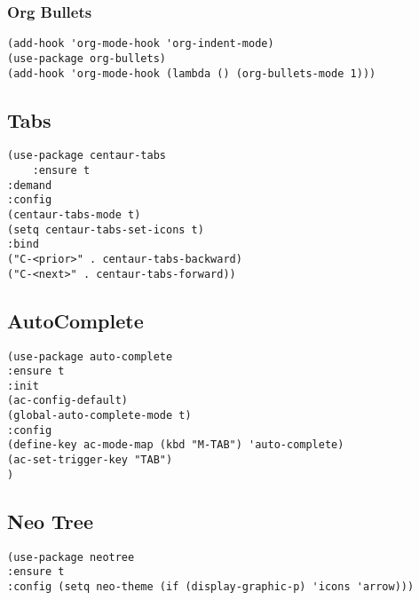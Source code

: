 \documentclass[11pt]{article}
\begin{document}
\subsubsection{Org Bullets}
\label{sec:org6249800}
\begin{verbatim}
(add-hook 'org-mode-hook 'org-indent-mode)
(use-package org-bullets)
(add-hook 'org-mode-hook (lambda () (org-bullets-mode 1)))
\end{verbatim}

\subsection{Tabs}
\label{sec:org4a150cb}
\begin{verbatim}
(use-package centaur-tabs
    :ensure t
:demand
:config
(centaur-tabs-mode t)
(setq centaur-tabs-set-icons t)
:bind
("C-<prior>" . centaur-tabs-backward)
("C-<next>" . centaur-tabs-forward))
\end{verbatim}

\subsection{AutoComplete}
\label{sec:org055b91b}
\begin{verbatim}
(use-package auto-complete
:ensure t
:init
(ac-config-default)
(global-auto-complete-mode t)
:config
(define-key ac-mode-map (kbd "M-TAB") 'auto-complete)
(ac-set-trigger-key "TAB")
)
\end{verbatim}

\subsection{Neo Tree}
\label{sec:orgd2bcee4}
\begin{verbatim}
(use-package neotree
:ensure t
:config (setq neo-theme (if (display-graphic-p) 'icons 'arrow)))
\end{verbatim}
\end{document}
